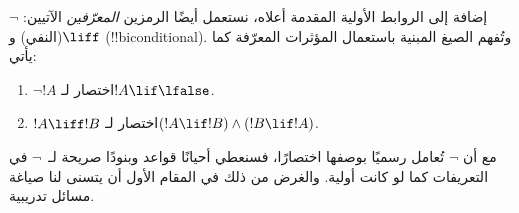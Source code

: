 \documentclass[../../../include/open-logic-section]{subfiles}
\begin{document}
إضافة إلى الروابط الأولية المقدمة أعلاه، نستعمل أيضًا الرمزين
\emph{المعرّفين} الآتيين: $\lnot$ (النفي) و$\liff$
(!!{biconditional}). وتُفهم الصيغ المبنية باستعمال المؤثرات المعرّفة
كما يأتي:
\begin{enumerate}
\item $\lnot !A$ اختصار لـ$!A \lif \lfalse$.

\item $!A \liff !B$ اختصار لـ$(!A \lif !B) \land (!B
  \lif !A)$.
\end{enumerate}

مع أن $\lnot$ تُعامل رسميًا بوصفها اختصارًا، فسنعطي أحيانًا قواعد
وبنودًا صريحة لـ~$\lnot$ في التعريفات كما لو كانت أولية. والغرض من ذلك
في المقام الأول أن يتسنى لنا صياغة مسائل تدريبية.
\end{document}
